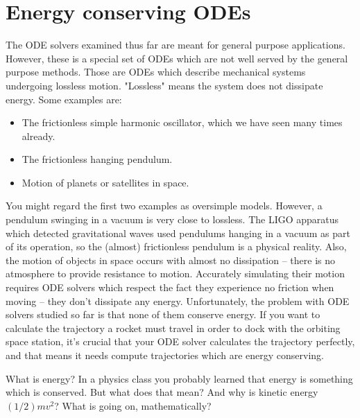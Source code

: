 \documentclass[hidelinks,notitlepage]{book}
\begin{document}
\section{Energy conserving ODEs}
\label{sect:EnergyConservation}
The ODE solvers examined thus far are meant for general purpose applications.   However, these is a special set of ODEs which are not well served by the general purpose methods.  Those are ODEs which describe mechanical systems undergoing lossless motion.  "Lossless" means the system does not dissipate energy. Some examples are:
\begin{itemize}
	\item The frictionless simple harmonic oscillator, which we have seen many times already.
	\item The frictionless hanging pendulum.
	\item Motion of planets or satellites in space.
\end{itemize}
You might regard the first two examples as oversimple models.  However, a pendulum swinging in a vacuum is very close to lossless.  The LIGO apparatus which detected gravitational waves used pendulums hanging in a vacuum as part of its operation, so the (almost) frictionless pendulum is a physical reality.  Also, the motion of objects in space occurs with almost no dissipation -- there is no atmosphere to provide resistance to motion.  Accurately simulating their motion requires ODE solvers which respect the fact they experience no friction when moving -- they don't dissipate any energy.  Unfortunately, the problem with ODE solvers studied so far is that none of them conserve energy.  If you want to calculate the trajectory a rocket must travel in order to dock with the orbiting space station, it's crucial that your ODE solver calculates the trajectory perfectly, and that means it needs compute trajectories which are energy conserving.

What is energy?  In a physics class you probably learned that energy is something which is conserved.  But what does that mean?  And why is kinetic energy $(1/2) m v^2$?  What is going on, mathematically?  
\end{document}
